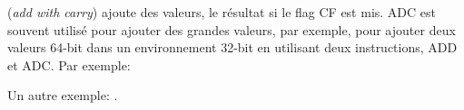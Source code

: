   \item[ADC] (\emph{add with carry})
  ajoute des valeurs,  le résultat si le flag CF est
  mis. ADC est souvent utilisé pour ajouter des grandes valeurs, par exemple, pour
  ajouter deux valeurs 64-bit dans un environnement 32-bit en utilisant deux
  instructions, ADD et ADC. Par exemple:



Un autre exemple: .
